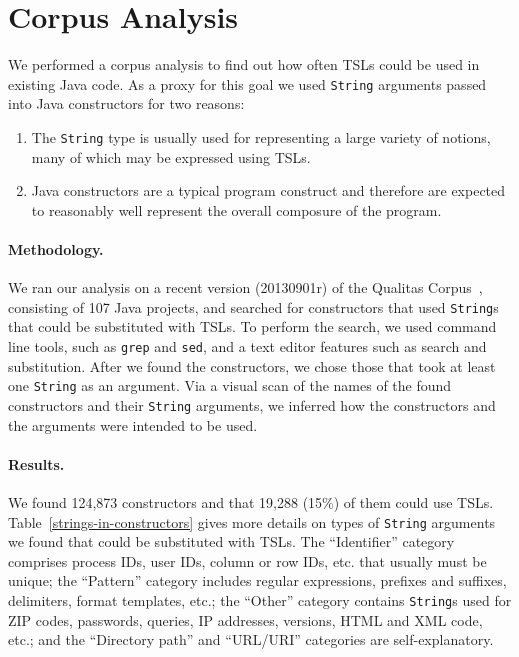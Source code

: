 
\section{Corpus Analysis}
\label{s:study}

We performed a corpus analysis to find out how often TSLs could be used in existing Java code. As a proxy for this goal we used \lstinline{String} arguments passed into Java constructors for two reasons:

\begin{enumerate}
\item The \lstinline{String} type is usually used for representing a large variety of notions, many of which may be expressed using TSLs.
\item Java constructors are a typical program construct and therefore are expected to reasonably well represent the overall composure of the program.
\end{enumerate}

\paragraph{Methodology.} We ran our analysis on a recent version (20130901r) of the Qualitas Corpus~\cite{QualitasCorpus:APSEC:2010}, consisting of 107 Java projects, and searched for constructors that used \lstinline{String}s that could be substituted with TSLs. To perform the search, we used command line tools, such as \lstinline{grep} and \lstinline{sed}, and a text editor features such as search and substitution. After we found the constructors, we chose those that took at least one \lstinline{String} as an argument. Via a visual scan of the names of the found constructors and their \lstinline{String} arguments, we inferred how the constructors and the arguments were intended to be used.


\paragraph{Results.} We found 124,873 constructors and that 19,288 (15\%) of them could use TSLs. Table~\ref{strings-in-constructors} gives more details on types of \lstinline{String} arguments we found that could be substituted with TSLs. The ``Identifier'' category comprises process IDs, user IDs, column or row IDs, etc. that usually must be unique; the ``Pattern'' category includes regular expressions, prefixes and suffixes, delimiters, format templates, etc.; the ``Other'' category contains \lstinline{String}s used for ZIP codes, passwords, queries, IP addresses, versions, HTML and XML code, etc.; and the ``Directory path'' and ``URL/URI'' categories are self-explanatory.

